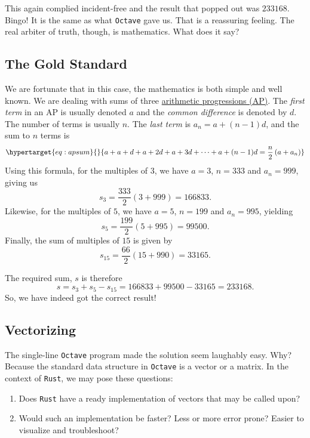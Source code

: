 \documentclass[
  a4paper,
]{article}
\begin{document}
This again complied incident-free and the result that popped out was
\(233168\). Bingo! It is the same as what \texttt{Octave} gave us. That
is a reassuring feeling. The real arbiter of truth, though, is
mathematics. What does it say?

\hypertarget{the-gold-standard}{%
\subsection{The Gold Standard}\label{the-gold-standard}}

We are fortunate that in this case, the mathematics is both simple and
well known. We are dealing with sums of three
\href{https://en.wikipedia.org/wiki/Arithmetic_progression\#Sum}{arithmetic
progressions (AP)}. The \emph{first term} in an AP is usually denoted
\(a\) and the \emph{common difference} is denoted by \(d\). The number
of terms is usually \(n\). The \emph{last term} is
\(a_n = a + (n - 1)d\), and the sum to \(n\) terms is
\begin{equation}\protect\hypertarget{eq:apsum}{}{
a + a + d + a + 2d + a + 3d + \cdots + a + (n - 1)d = \frac{n}{2}\left( a + a_n \right)
}\label{eq:apsum}\end{equation} Using this formula, for the multiples of
\(3\), we have \(a = 3\), \(n = 333\) and \(a_n=999\), giving us \[
s_3 = \frac{333}{2}\left( 3 + 999\right) = 166833.
\] Likewise, for the multiples of \(5\), we have \(a = 5\), \(n = 199\)
and \(a_n = 995\), yielding \[
s_5 = \frac{199}{2}\left( 5 + 995\right) = 99500.
\] Finally, the sum of multiples of \(15\) is given by \[
s_{15} = \frac{66}{2}\left( 15 + 990\right) = 33165.
\]

The required sum, \(s\) is therefore \[
s= s_3 + s_5 - s_{15} = 166833 + 99500 -33165 = 233168.
\] So, we have indeed got the correct result!

\hypertarget{vectorizing}{%
\subsection{Vectorizing}\label{vectorizing}}

The single-line \texttt{Octave} program made the solution seem laughably
easy. Why? Because the standard data structure in \texttt{Octave} is a
vector or a matrix. In the context of \texttt{Rust}, we may pose these
questions:

\begin{enumerate}
\item
  Does \texttt{Rust} have a ready implementation of vectors that may be
  called upon?
\item
  Would such an implementation be faster? Less or more error prone?
  Easier to visualize and troubleshoot?
\end{enumerate}
\end{document}
